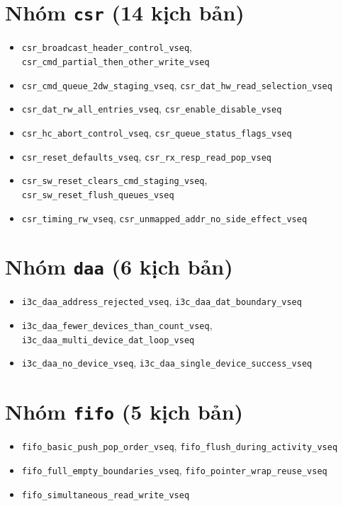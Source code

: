 \section*{Nhóm \texttt{csr} (14 kịch bản)}
\begin{itemize}\itemsep0pt
  \item \texttt{csr\_broadcast\_header\_control\_vseq}, \texttt{csr\_cmd\_partial\_then\_other\_write\_vseq}
  \item \texttt{csr\_cmd\_queue\_2dw\_staging\_vseq}, \texttt{csr\_dat\_hw\_read\_selection\_vseq}
  \item \texttt{csr\_dat\_rw\_all\_entries\_vseq}, \texttt{csr\_enable\_disable\_vseq}
  \item \texttt{csr\_hc\_abort\_control\_vseq}, \texttt{csr\_queue\_status\_flags\_vseq}
  \item \texttt{csr\_reset\_defaults\_vseq}, \texttt{csr\_rx\_resp\_read\_pop\_vseq}
  \item \texttt{csr\_sw\_reset\_clears\_cmd\_staging\_vseq}, \texttt{csr\_sw\_reset\_flush\_queues\_vseq}
  \item \texttt{csr\_timing\_rw\_vseq}, \texttt{csr\_unmapped\_addr\_no\_side\_effect\_vseq}
\end{itemize}

\section*{Nhóm \texttt{daa} (6 kịch bản)}
\begin{itemize}\itemsep0pt
  \item \texttt{i3c\_daa\_address\_rejected\_vseq}, \texttt{i3c\_daa\_dat\_boundary\_vseq}
  \item \texttt{i3c\_daa\_fewer\_devices\_than\_count\_vseq}, \texttt{i3c\_daa\_multi\_device\_dat\_loop\_vseq}
  \item \texttt{i3c\_daa\_no\_device\_vseq}, \texttt{i3c\_daa\_single\_device\_success\_vseq}
\end{itemize}

\section*{Nhóm \texttt{fifo} (5 kịch bản)}
\begin{itemize}\itemsep0pt
  \item \texttt{fifo\_basic\_push\_pop\_order\_vseq}, \texttt{fifo\_flush\_during\_activity\_vseq}
  \item \texttt{fifo\_full\_empty\_boundaries\_vseq}, \texttt{fifo\_pointer\_wrap\_reuse\_vseq}
  \item \texttt{fifo\_simultaneous\_read\_write\_vseq}
\end{itemize}

